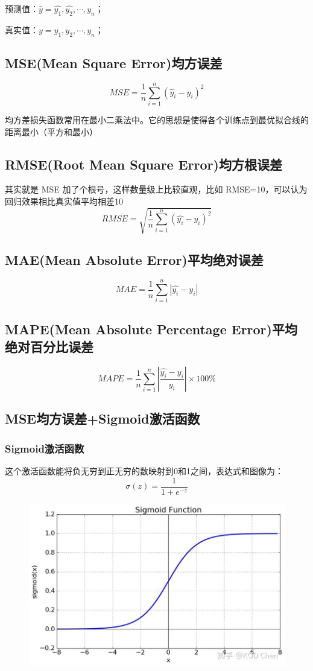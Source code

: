 \documentclass[12pt]{article}
\begin{document}
预测值：$\hat{y} = {\hat{y_1},\hat{y_2},\cdots,\hat{y_n}}$；

真实值：$y = {y_1, y_2, \cdots, y_n}$；

\subsection{MSE(Mean Square Error)均方误差}
$$MSE = \frac{1}{n}\sum_{i=1}^{n}(\hat{y_i} - y_i)^2$$

均方差损失函数常用在最小二乘法中。它的思想是使得各个训练点到最优拟合线的距离最小（平方和最小）

\subsection{RMSE(Root Mean Square Error)均方根误差}
其实就是 MSE 加了个根号，这样数量级上比较直观，比如 RMSE=10，可以认为回归效果相比真实值平均相差10
$$RMSE = \sqrt{\frac{1}{n}\sum_{i=1}^{n}(\hat{y_i} - y_i)^2}$$

\subsection{MAE(Mean Absolute Error)平均绝对误差}
$$MAE = \frac{1}{n}\sum_{i=1}^{n}|\hat{y_i} - y_i|$$

\subsection{MAPE(Mean Absolute Percentage Error)平均绝对百分比误差}
$$MAPE = \frac{1}{n}\sum_{i=1}^{n}|\frac{\hat{y_i} - y_i}{y_i}|\times 100\%$$

\subsection{MSE均方误差+Sigmoid激活函数\cite{Commonly_Loss_Functions}}
\subsubsection{Sigmoid激活函数}
这个激活函数能将负无穷到正无穷的数映射到0和1之间，表达式和图像为：
$$
\sigma(z) = \frac{1}{1 + e^{-z}}
$$
\begin{figure}[H]
  \centering
  \includegraphics[width=.5\textwidth]{fig/sigmoid_illustration.jpg} 
\end{figure}
\end{document}
